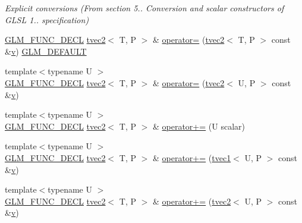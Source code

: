 \begin{DoxyCompactItemize}
\begin{DoxyCompactList}\small\item\em Explicit conversions (From section 5.. Conversion and scalar constructors of G\+L\+SL 1.. specification) \end{DoxyCompactList}\item 
\mbox{\hyperlink{setup_8hpp_ab2d052de21a70539923e9bcbf6e83a51}{G\+L\+M\+\_\+\+F\+U\+N\+C\+\_\+\+D\+E\+CL}} \mbox{\hyperlink{structglm_1_1tvec2}{tvec2}}$<$ T, P $>$ \& \mbox{\hyperlink{structglm_1_1tvec2_af80d08c6419d329c7df4d622429e1d79}{operator=}} (\mbox{\hyperlink{structglm_1_1tvec2}{tvec2}}$<$ T, P $>$ const \&\mbox{\hyperlink{glad_8h_a14cfbe2fc2234f5504618905b69d1e06}{v}}) \mbox{\hyperlink{setup_8hpp_aefce7051c376a64ba89fa93a9f63bc2c}{G\+L\+M\+\_\+\+D\+E\+F\+A\+U\+LT}}
\item 
{\footnotesize template$<$typename U $>$ }\\\mbox{\hyperlink{setup_8hpp_ab2d052de21a70539923e9bcbf6e83a51}{G\+L\+M\+\_\+\+F\+U\+N\+C\+\_\+\+D\+E\+CL}} \mbox{\hyperlink{structglm_1_1tvec2}{tvec2}}$<$ T, P $>$ \& \mbox{\hyperlink{structglm_1_1tvec2_a90eca373f8d7c27d73412f242cf1551e}{operator=}} (\mbox{\hyperlink{structglm_1_1tvec2}{tvec2}}$<$ U, P $>$ const \&\mbox{\hyperlink{glad_8h_a14cfbe2fc2234f5504618905b69d1e06}{v}})
\item 
{\footnotesize template$<$typename U $>$ }\\\mbox{\hyperlink{setup_8hpp_ab2d052de21a70539923e9bcbf6e83a51}{G\+L\+M\+\_\+\+F\+U\+N\+C\+\_\+\+D\+E\+CL}} \mbox{\hyperlink{structglm_1_1tvec2}{tvec2}}$<$ T, P $>$ \& \mbox{\hyperlink{structglm_1_1tvec2_ab4a77220c5c80ac512efab4303ed0a6d}{operator+=}} (U scalar)
\item 
{\footnotesize template$<$typename U $>$ }\\\mbox{\hyperlink{setup_8hpp_ab2d052de21a70539923e9bcbf6e83a51}{G\+L\+M\+\_\+\+F\+U\+N\+C\+\_\+\+D\+E\+CL}} \mbox{\hyperlink{structglm_1_1tvec2}{tvec2}}$<$ T, P $>$ \& \mbox{\hyperlink{structglm_1_1tvec2_a260a29a9ba826d24f418f01ebd274d39}{operator+=}} (\mbox{\hyperlink{structglm_1_1tvec1}{tvec1}}$<$ U, P $>$ const \&\mbox{\hyperlink{glad_8h_a14cfbe2fc2234f5504618905b69d1e06}{v}})
\item 
{\footnotesize template$<$typename U $>$ }\\\mbox{\hyperlink{setup_8hpp_ab2d052de21a70539923e9bcbf6e83a51}{G\+L\+M\+\_\+\+F\+U\+N\+C\+\_\+\+D\+E\+CL}} \mbox{\hyperlink{structglm_1_1tvec2}{tvec2}}$<$ T, P $>$ \& \mbox{\hyperlink{structglm_1_1tvec2_a8b512889a3d9ef4536135b1806cb19c4}{operator+=}} (\mbox{\hyperlink{structglm_1_1tvec2}{tvec2}}$<$ U, P $>$ const \&\mbox{\hyperlink{glad_8h_a14cfbe2fc2234f5504618905b69d1e06}{v}})

\end{DoxyCompactItemize}
